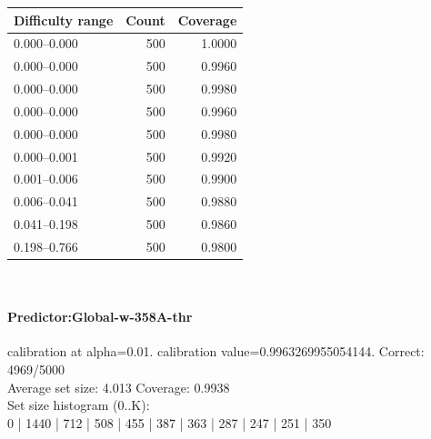 \documentclass[parskip=half]{scrartcl}
\begin{document}
\begin{tabular}{l r r}
\hline
Difficulty range & Count & Coverage \\
\hline
0.000--0.000 & 500 & 1.0000 \\
0.000--0.000 & 500 & 0.9960 \\
0.000--0.000 & 500 & 0.9980 \\
0.000--0.000 & 500 & 0.9960 \\
0.000--0.000 & 500 & 0.9980 \\
0.000--0.001 & 500 & 0.9920 \\
0.001--0.006 & 500 & 0.9900 \\
0.006--0.041 & 500 & 0.9880 \\
0.041--0.198 & 500 & 0.9860 \\
0.198--0.766 & 500 & 0.9800 \\
\hline
\end{tabular}\\[0.5em]
\paragraph{Predictor:Global-w-358A-thr} calibration at alpha=0.01. calibration value=0.9963269955054144. Correct: 4969/5000\\
Average set size: 4.013   Coverage: 0.9938\\
Set size histogram (0..K):\\
0 | 1440 | 712 | 508 | 455 | 387 | 363 | 287 | 247 | 251 | 350\\
\end{document}
